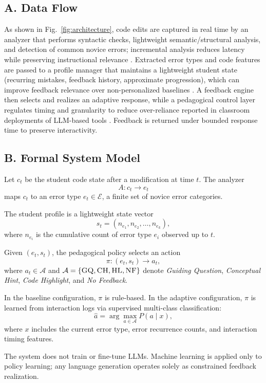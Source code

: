 \documentclass[conference]{IEEEtran}
\begin{document}
\subsection*{A. Data Flow}
As shown in Fig.~\ref{fig:architecture}, code edits are captured in real time by an analyzer that performs syntactic checks, lightweight semantic/structural analysis, and detection of common novice errors; incremental analysis reduces latency while preserving instructional relevance \cite{ProgTutor}. Extracted error types and code features are passed to a profile manager that maintains a lightweight student state (recurring mistakes, feedback history, approximate progression), which can improve feedback relevance over non-personalized baselines \cite{IRIS,AIEnabledIntelligentAssistant}. A feedback engine then selects and realizes an adaptive response, while a pedagogical control layer regulates timing and granularity to reduce over-reliance reported in classroom deployments of LLM-based tools \cite{PatternsofLLMPoweredProgrammingAssistant,CodeAid}. Feedback is returned under bounded response time to preserve interactivity.

\subsection*{B. Formal System Model}
Let $c_t$ be the student code state after a modification at time $t$. The analyzer
\[
A: c_t \rightarrow e_t
\]
maps $c_t$ to an error type $e_t \in \mathcal{E}$, a finite set of novice error categories.

The student profile is a lightweight state vector
\[
s_t = (n_{e_1}, n_{e_2}, \dots, n_{e_k}),
\]
where $n_{e_i}$ is the cumulative count of error type $e_i$ observed up to $t$.

Given $(e_t, s_t)$, the pedagogical policy selects an action
\[
\pi: (e_t, s_t) \rightarrow a_t,
\]
where $a_t \in \mathcal{A}$ and
$\mathcal{A}=\{\textsc{GQ}, \textsc{CH}, \textsc{HL}, \textsc{NF}\}$
denote \emph{Guiding Question}, \emph{Conceptual Hint}, \emph{Code Highlight}, and \emph{No Feedback}.

In the baseline configuration, $\pi$ is rule-based. In the adaptive configuration, $\pi$ is learned from interaction logs via supervised multi-class classification:
\[
\hat{a} = \arg\max_{a \in \mathcal{A}} P(a \mid x),
\]
where $x$ includes the current error type, error recurrence counts, and interaction timing features.

The system does not train or fine-tune LLMs. Machine learning is applied only to policy learning; any language generation operates solely as constrained feedback realization.
\end{document}
